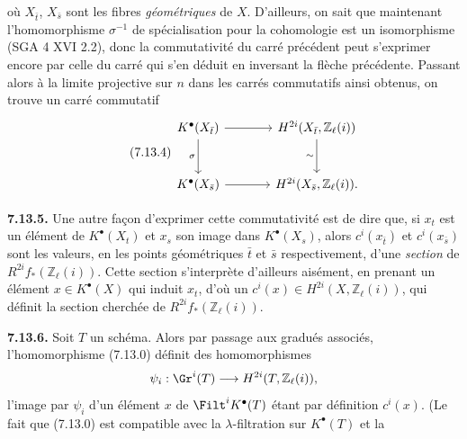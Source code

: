 où \(X_{\bar t}\), \(X_{\bar s}\)
sont les fibres \emph{géométriques} de \(X\). D'ailleurs, on sait que maintenant l'homomorphisme \(\sigma^{-1}\) de spécialisation pour la cohomologie est un isomorphisme (SGA 4 XVI 2.2), donc la commutativité du carré précédent peut s'exprimer encore par celle du carré qui s'en déduit en inversant la flèche précédente. Passant alors à la limite projective sur \(n\) dans les carrés commutatifs ainsi obtenus, on trouve un carré commutatif
\begin{equation}\tag{7.13.4}
\begin{tikzcd}[column sep=large,row sep=large]
K^\bullet(X_{\bar t}) \arrow[r] \arrow[d,"\sigma"'] &
H^{2i}(X_{\bar t},\mathbb Z_\ell(i)) \arrow[d,"\sim"']\\
K^\bullet(X_{\bar s}) \arrow[r] &
H^{2i}(X_{\bar s},\mathbb Z_\ell(i)).
\end{tikzcd}
\end{equation}

\textbf{7.13.5.} Une autre façon d'exprimer cette commutativité est de dire que, si \(x_t\) est un élément de \(K^\bullet(X_t)\) et \(x_s\) son image dans \(K^\bullet(X_s)\), alors \(c^i(x_{\bar t})\) et \(c^i(x_{\bar s})\) sont les valeurs, en les points géométriques \(\bar t\) et \(\bar s\) respectivement, d'une \emph{section} de \(R^{2i}f_*(\mathbb Z_\ell(i))\). Cette section s'interprète d'ailleurs aisément, en prenant un élément \(x\in K^\bullet(X)\) qui induit \(x_t\), d'où un \(c^i(x)\in H^{2i}(X,\mathbb Z_\ell(i))\), qui définit la section cherchée de \(R^{2i}f_*(\mathbb Z_\ell(i))\).

\textbf{7.13.6.} Soit \(T\) un schéma. Alors par passage aux gradués associés, l'homomorphisme (7.13.0) définit des homomorphismes
\[
  \psi_i:\Gr^i(T)\longrightarrow H^{2i}(T,\mathbb Z_\ell(i)),
\]
l'image par \(\psi_i\) d'un élément \(x\) de \(\Filt^iK^\bullet(T)\) étant par définition \(c^i(x)\). (Le fait que (7.13.0) est compatible avec la \(\lambda\)-filtration sur \(K^\bullet(T)\) et la
